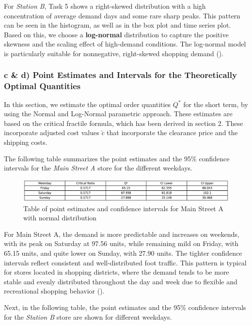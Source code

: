 For \emph{Station B}, Task 5 shows a right-skewed distribution with a high concentration of average demand days and some rare sharp peaks. This pattern can be seen in the histogram, as well as in the box plot and time series plot. Based on this, we choose a \textbf{log-normal} distribution to capture the positive skewness and the scaling effect of high-demand conditions. The log-normal model is particularly suitable for nonnegative, right-skewed shopping demand (\cite{rojas2021}).


\subsubsection*{c \& d) Point Estimates and Intervals for the Theoretically Optimal Quantities}
\medskip

In this section, we estimate the optimal order quantities $Q^*$ for the short term, by using the Normal and Log-Normal parametric approach. These estimates are based on the critical fractile formula, which has been derived in section 2. These incorporate adjusted cost values $\tilde{c}$ that incorporate the clearance price and the shipping costs.

The following table summarizes the point estimates and the 95\% confidence intervals for the \emph{Main Street A} store for the different weekdays.

\begin{figure}[H]
    \centering
    \includegraphics[width=1\textwidth]
    {figures/Figure_Normal_MainStreetA.png}
    \caption{Table of point estimates and confidence intervals for Main Street A with normal distribution}
    \label{fig:Table for Main Street A}
\end{figure}

For Main Street A, the demand is more predictable and increases on weekends, with its peak on Saturday at 97.56 units, while remaining mild on Friday, with 65.15 units, and quite lower on Sunday, with 27.90 units. The tighter confidence intervals reflect consistent and well-distributed foot traffic. This pattern is typical for stores located in shopping districts, where the demand tends to be more stable and evenly distributed throughout the day and week due to flexible and recreational shopping behavior (\cite{berry2016}).

Next, in the following table, the point estimates and the 95\% confidence intervals for the \emph{Station B} store are shown for different weekdays.

